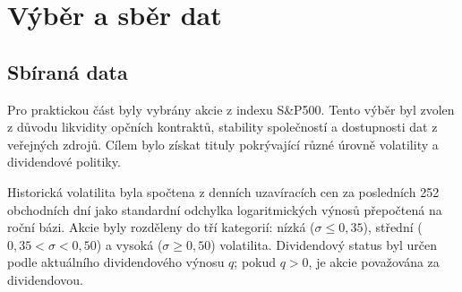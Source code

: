 
\section{Výběr a sběr dat}

\subsection{Sbíraná data}

Pro praktickou část byly vybrány akcie z indexu S\&P500. Tento výběr byl zvolen z důvodu likvidity opčních kontraktů, stability společností a dostupnosti dat z veřejných zdrojů. Cílem bylo získat tituly pokrývající různé úrovně volatility a dividendové politiky.

Historická volatilita byla spočtena z denních uzavíracích cen za posledních 252 obchodních dní jako standardní odchylka logaritmických výnosů přepočtená na roční bázi. Akcie byly rozděleny do tří kategorií: nízká (\(\sigma \le 0{,}35\)), střední (\(0{,}35 < \sigma < 0{,}50\)) a vysoká (\(\sigma \ge 0{,}50\)) volatilita. Dividendový status byl určen podle aktuálního dividendového výnosu \(q\); pokud \(q > 0\), je akcie považována za dividendovou.

